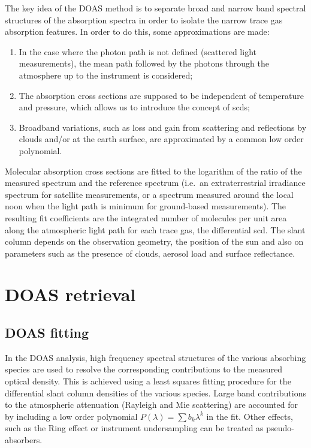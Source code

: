 The key idea of the DOAS method is to separate broad and narrow band
spectral structures of the absorption spectra in order to isolate the
narrow trace gas absorption features. In order to do this, some
approximations are made:
\begin{enumerate}
\item In the case where the photon path is not defined (scattered light
  measurements), the mean path followed by the photons through the
 atmosphere up to the instrument is considered;
\item The absorption cross sections are supposed to be independent of
  temperature and pressure, which allows us to introduce the concept
  of \glspl{scd};
\item Broadband variations, such as loss and gain from scattering and
  reflections by clouds and/or at the earth surface, are approximated
  by a common low order polynomial.
\end{enumerate}
Molecular absorption cross sections are fitted to the logarithm of the
ratio of the measured spectrum and the reference spectrum (i.e.\ an
extraterrestrial irradiance spectrum for satellite measurements, or a
spectrum measured around the local noon when the light path is minimum
for ground-based measurements). The resulting fit coefficients are the
integrated number of molecules per unit area along the atmospheric
light path for each trace gas, the differential \gls{scd}. The slant column depends
on the observation geometry, the position of the sun and also on
parameters such as the presence of clouds, aerosol load and surface
reflectance.

\section{DOAS retrieval}\label{sec:doas-retrieval}
\subsection{DOAS fitting}\label{sec:doas-fitting}
In the DOAS analysis, high frequency spectral structures of the
various absorbing species are used to resolve the corresponding
contributions to the measured optical density. This is achieved using
a least squares fitting procedure for the differential slant column
densities of the various species.  Large band contributions to the
atmospheric attenuation (Rayleigh and Mie scattering) are accounted
for by including a low order polynomial $P(\lambda) = \sum b_k
\lambda^k$ in the fit. Other effects, such as the Ring effect or
instrument undersampling can be treated as pseudo-absorbers.

